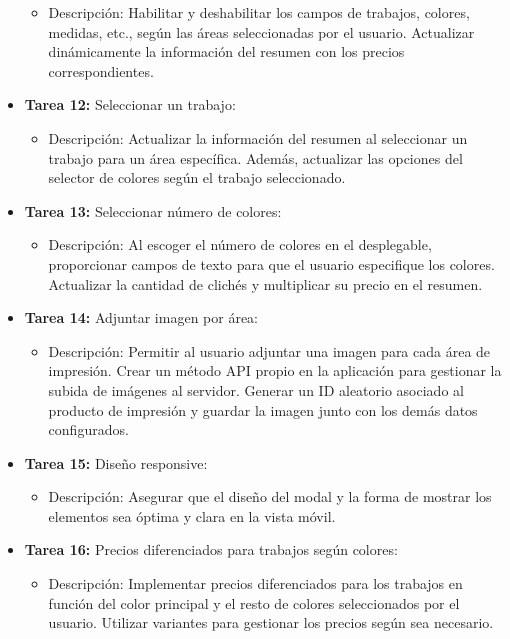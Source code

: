 \documentclass[12pt]{article}
\begin{document}
\begin{itemize}
          \begin{itemize}[label=--]
              \item Descripción: Habilitar y deshabilitar los campos de trabajos, colores, medidas, etc., según las áreas seleccionadas por el usuario. Actualizar dinámicamente la información del resumen con los precios correspondientes.
          \end{itemize}
    \item \textbf{Tarea 12:} Seleccionar un trabajo:
          \begin{itemize}[label=--]
              \item Descripción: Actualizar la información del resumen al seleccionar un trabajo para un área específica. Además, actualizar las opciones del selector de colores según el trabajo seleccionado.
          \end{itemize}
    \item \textbf{Tarea 13:} Seleccionar número de colores:
          \begin{itemize}[label=--]
              \item Descripción: Al escoger el número de colores en el desplegable, proporcionar campos de texto para que el usuario especifique los colores. Actualizar la cantidad de clichés y multiplicar su precio en el resumen.
          \end{itemize}
    \item \textbf{Tarea 14:} Adjuntar imagen por área:
          \begin{itemize}[label=--]
              \item Descripción: Permitir al usuario adjuntar una imagen para cada área de impresión. Crear un método API propio en la aplicación para gestionar la subida de imágenes al servidor. Generar un ID aleatorio asociado al producto de impresión y guardar la imagen junto con los demás datos configurados.
          \end{itemize}
    \item \textbf{Tarea 15:} Diseño responsive:
          \begin{itemize}[label=--]
              \item Descripción: Asegurar que el diseño del modal y la forma de mostrar los elementos sea óptima y clara en la vista móvil.
          \end{itemize}
    \item \textbf{Tarea 16:} Precios diferenciados para trabajos según colores:
          \begin{itemize}[label=--]
              \item Descripción: Implementar precios diferenciados para los trabajos en función del color principal y el resto de colores seleccionados por el usuario. Utilizar variantes para gestionar los precios según sea necesario.
          \end{itemize}
\end{itemize}
\end{document}
